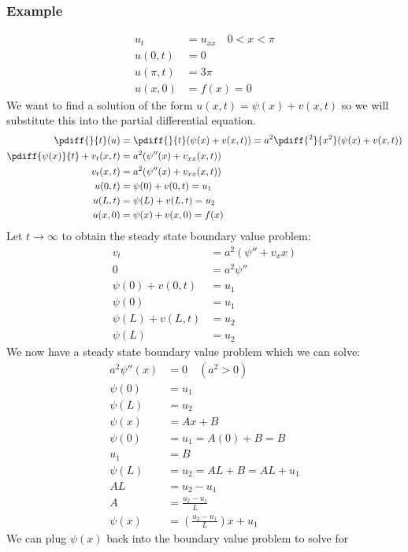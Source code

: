 \documentclass{math}
\begin{document}
\subsubsection*{Example}
\begin{align*}
  u_t &= u_{xx} \quad 0<x<\pi \\
  u(0,t) &= 0 \\
  u(\pi,t) &= 3\pi \\
  u(x,0) &= f(x) = 0
\end{align*}
We want to find a solution of the form \( u(x,t) = \psi(x)+v(x,t) \) so we will
substitute this into the partial differential equation.
\begin{align*}
  \pdiff{}{t}(u) &= \pdiff{}{t}(\psi(x)+v(x,t)) =
    a^2\pdiff{^2}{x^2}(\psi(x)+v(x,t)) \\
  \pdiff{\psi(x)}{t}+v_t(x,t) &= a^2(\psi''(x)+v_{xx}(x,t)) \\
  v_t(x,t) &= a^2(\psi''(x)+v_{xx}(x,t)) \\
  u(0,t) &= \psi(0)+v(0,t) = u_1 \\
  u(L,t) &= \psi(L)+v(L,t) = u_2 \\
  u(x,0) &= \psi(x)+v(x,0) = f(x)
\end{align*}
Let \( t\to\infty \) to obtain the steady state boundary value problem:
\begin{align*}
  v_t &= a^2(\psi''+v_xx) \\
  0 &= a^2\psi'' \\
  \psi(0)+v(0,t) &= u_1 \\
  \psi(0) &= u_1 \\
  \psi(L)+v(L,t) &= u_2 \\
  \psi(L) &= u_2
\end{align*}
We now have a steady state boundary value problem which we can solve:
\begin{align*}
  a^2\psi''(x) &= 0 \quad (a^2>0) \\
  \psi(0) &= u_1 \\
  \psi(L) &= u_2 \\
  \psi(x) &= Ax+B \\
  \psi(0) &= u_1 = A(0)+B = B \\
  u_1 &= B \\
  \psi(L) &= u_2 = AL+B = AL+u_1 \\
  AL &= u_2-u_1 \\
  A &= \frac{u_2-u_1}{L} \\
  \psi(x) &= (\frac{u_2-u_1}{L})x+u_1
\end{align*}
We can plug \( \psi(x) \) back into the boundary value problem to solve for
\end{document}
